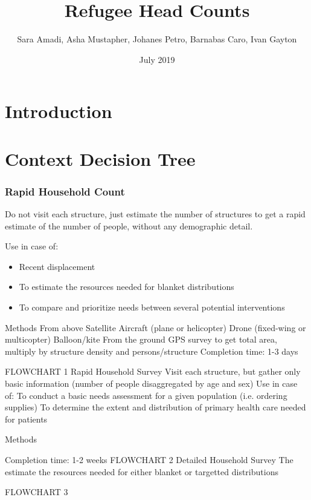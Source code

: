 \documentclass[a4paper,12pt,twoside]{article}
\title{Refugee Head Counts}
\author{Sara Amadi, Asha Mustapher, Johanes Petro, Barnabas Caro, Ivan Gayton }
\date{July 2019}
\begin{document}
\maketitle

\section{Introduction}

\section{Context Decision Tree}

\subsubsection{Rapid Household Count}
Do not visit each structure, just estimate the number of structures to get a rapid estimate of the number of people, without any demographic detail.

Use in case of:

\begin{itemize}
  \item Recent displacement
  \item To estimate the resources needed for blanket distributions
  \item To compare and prioritize needs between several potential interventions
\end{itemize}
Methods
From above
Satellite 
Aircraft (plane or helicopter)
Drone (fixed-wing or multicopter)
Balloon/kite
From the ground
GPS survey to get total area, multiply by structure density and persons/structure
Completion time: 1-3 days

FLOWCHART 1
Rapid Household Survey
Visit each structure, but gather only basic information (number of people disaggregated by age and sex)
Use in case of:
To conduct a basic needs assessment for a given population (i.e. ordering supplies)
To determine the extent and distribution of primary health care needed for patients


Methods

Completion time: 1-2 weeks
FLOWCHART 2
Detailed Household Survey
The estimate the resources needed for either blanket or targetted distributions


FLOWCHART 3
\end{document}
